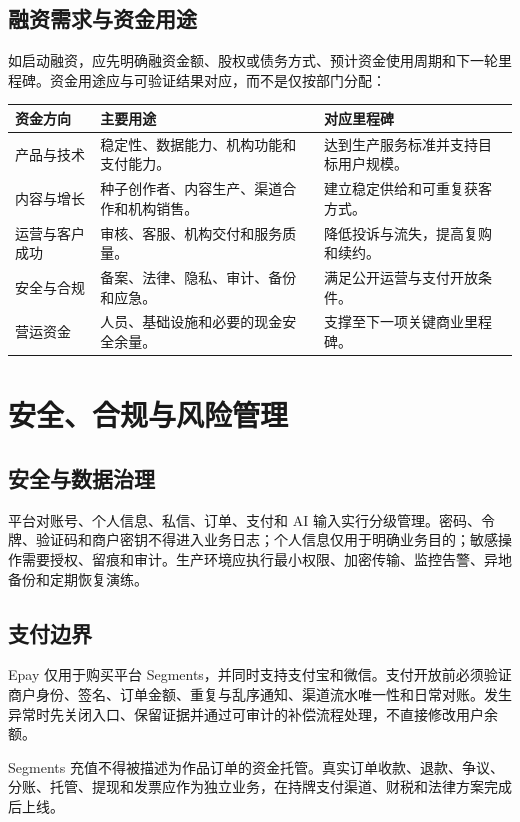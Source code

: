 \documentclass[12pt,a4paper,openany,fontset=fandol]{ctexrep}
\begin{document}
\section{融资需求与资金用途}

如启动融资，应先明确融资金额、股权或债务方式、预计资金使用周期和下一轮里程碑。资金用途应与可验证结果对应，而不是仅按部门分配：

\begin{longtable}{p{3.2cm} p{5.1cm} p{5.2cm}}
\toprule
资金方向 & 主要用途 & 对应里程碑 \\
\midrule
产品与技术 & 稳定性、数据能力、机构功能和支付能力。 & 达到生产服务标准并支持目标用户规模。 \\
内容与增长 & 种子创作者、内容生产、渠道合作和机构销售。 & 建立稳定供给和可重复获客方式。 \\
运营与客户成功 & 审核、客服、机构交付和服务质量。 & 降低投诉与流失，提高复购和续约。 \\
安全与合规 & 备案、法律、隐私、审计、备份和应急。 & 满足公开运营与支付开放条件。 \\
营运资金 & 人员、基础设施和必要的现金安全余量。 & 支撑至下一项关键商业里程碑。 \\
\bottomrule
\end{longtable}

\chapter{安全、合规与风险管理}

\section{安全与数据治理}

平台对账号、个人信息、私信、订单、支付和 AI 输入实行分级管理。密码、令牌、验证码和商户密钥不得进入业务日志；个人信息仅用于明确业务目的；敏感操作需要授权、留痕和审计。生产环境应执行最小权限、加密传输、监控告警、异地备份和定期恢复演练。

\section{支付边界}

Epay 仅用于购买平台 Segments，并同时支持支付宝和微信。支付开放前必须验证商户身份、签名、订单金额、重复与乱序通知、渠道流水唯一性和日常对账。发生异常时先关闭入口、保留证据并通过可审计的补偿流程处理，不直接修改用户余额。

Segments 充值不得被描述为作品订单的资金托管。真实订单收款、退款、争议、分账、托管、提现和发票应作为独立业务，在持牌支付渠道、财税和法律方案完成后上线。
\end{document}
